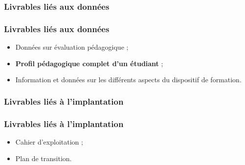 					\subsubsection{Livrables liés aux données} 
							\begin{frame}
							\frametitle{Livrables liés aux données}
                        			
							\begin{itemize}
							
							\item Données sur évaluation pédagogique ;
							\item \textbf{Profil pédagogique complet d’un étudiant };
							\item Information et données sur les différents aspects du dispositif de formation.
								
							\end{itemize}						
					\end{frame}
					
					\subsubsection{Livrables liés à l'implantation} 
							\begin{frame}
							\frametitle{Livrables liés à l'implantation}
                        			
							\begin{itemize}
							
							\item Cahier d’exploitation ; 
							\item Plan de transition.
								
							\end{itemize}						
					\end{frame}
					
					
